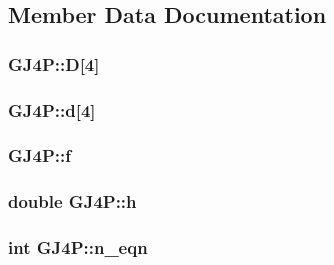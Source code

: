 \subsection{Member Data Documentation}
\hypertarget{classGJ4P_a3eae5b98a2fffccb6ac8077b6b9f91ac}{
\subsubsection[{D}]{ G\-J4\-P\-::\-D\mbox{[}4\mbox{]}\hspace{0.3cm}{\ttfamily [private]}}}\label{classGJ4P_a3eae5b98a2fffccb6ac8077b6b9f91ac}
\hypertarget{classGJ4P_af79b34b383d9f4a1833a824c88930e2f}{
\subsubsection[{d}]{ G\-J4\-P\-::d\mbox{[}4\mbox{]}\hspace{0.3cm}{\ttfamily [private]}}}\label{classGJ4P_af79b34b383d9f4a1833a824c88930e2f}
\hypertarget{classGJ4P_aa89b54b895c07be97071abb62b855db7}{
\subsubsection[{f}]{ G\-J4\-P\-::f\hspace{0.3cm}{\ttfamily [private]}}}\label{classGJ4P_aa89b54b895c07be97071abb62b855db7}
\hypertarget{classGJ4P_a9753300eabe5c63cbb459b149c915fc7}{
\subsubsection[{h}]{\setlength{\rightskip}{0pt plus 5cm}double G\-J4\-P\-::h\hspace{0.3cm}{\ttfamily [private]}}}\label{classGJ4P_a9753300eabe5c63cbb459b149c915fc7}
\hypertarget{classGJ4P_a20994ce5f5a14b8000786ad42639ca97}{
\subsubsection[{n\-\_\-eqn}]{\setlength{\rightskip}{0pt plus 5cm}int G\-J4\-P\-::n\-\_\-eqn\hspace{0.3cm}{\ttfamily [private]}}}\label{classGJ4P_a20994ce5f5a14b8000786ad42639ca97}
